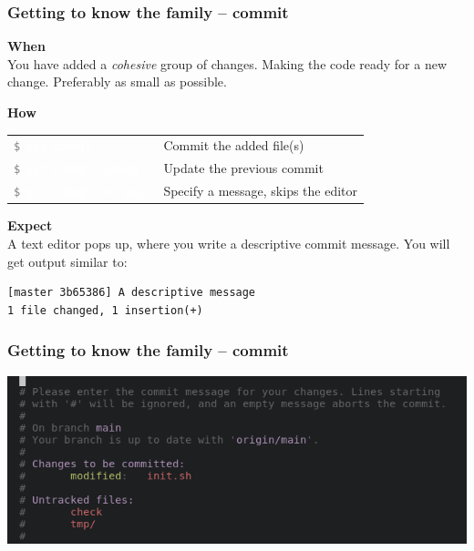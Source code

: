 \documentclass{beamer}
\newcommand{\keyword}[1]{\hspace{-1.0em}\textcolor{lkblue}{\textbf{#1}}\vspace{0.2em}} %
\newcommand{\command}[1]{\colorbox{black!78}{\vphantom{Ep}\texttt{\textcolor{gray}{\$}
\textcolor{white}{#1}}}}
\begin{document}
\begin{frame}[fragile]
  \frametitle{Getting to know the family -- commit}
  \keyword{When}\\
    You have added a \emph{cohesive} group of changes. Making
    the code ready for a new change. Preferably as small as possible.
  \vspace{0.5em}

  \keyword{How}\\
  \hspace{-0.95em}
  \begin{tabular}{ll}
    \command{git commit} & Commit the added file(s) \\
    \command{git commit --amend} & Update the previous commit \\
    \command{git commit -m "msg"} & Specify a message, skips the editor \\
  \end{tabular}
  \vspace{0.5em}

  \keyword{Expect}\\
  A text editor pops up, where you write a descriptive commit message. You will get
  output similar to: \\
\begin{verbatim}
[master 3b65386] A descriptive message
1 file changed, 1 insertion(+)
\end{verbatim}

\end{frame}

\begin{frame}
  \frametitle{Getting to know the family -- commit}
  \includegraphics[width=\linewidth]{commit}
\end{frame}

\end{document}
